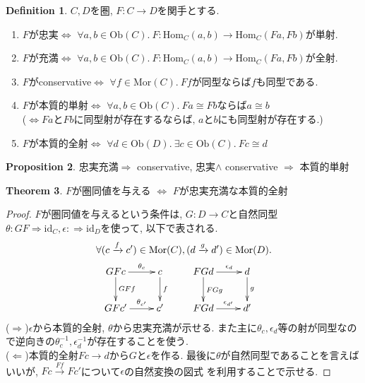 \documentclass[a4paper,10pt]{article}
\theoremstyle{definition}
\newtheorem{thm}{\bfseries Theorem}[section]
\newtheorem{definition}[thm]{\bfseries Definition}
\newtheorem{prop}[thm]{\bfseries Proposition} %
\begin{document}
\begin{definition}
    $C, D$を圏, $F:C \rightarrow D$を関手とする. 
    \begin{enumerate}[(1)]
        \item $F$が忠実$\Longleftrightarrow$ 
        $\forall a,b \in \mathrm{Ob}(C).\  
        F: \mathrm{Hom}_C(a,b) \rightarrow \mathrm{Hom}_C(Fa,Fb)$が単射.
        \item $F$が充満$\Longleftrightarrow$ 
        $\forall a,b \in \mathrm{Ob}(C).\  
        F: \mathrm{Hom}_C(a,b) \rightarrow \mathrm{Hom}_C(Fa,Fb)$が全射.
        \item $F$がconservative$\Longleftrightarrow$ 
        $\forall f \in \mathrm{Mor}(C).\  
        Ff \text{が同型ならば} f \text{も同型である}$.
        \item $F$が本質的単射$\Longleftrightarrow$ 
        $\forall a, b \in \mathrm{Ob}(C).\  
        Fa \cong Fb \text{ならば} a \cong b$ \\
        ($\Longleftrightarrow Fa\text{と}Fb\text{に同型射が存在するならば, }
        a\text{と}b\text{にも同型射が存在する.}$)
        \item $F$が本質的全射$\Longleftrightarrow$ 
        $\forall d \in \mathrm{Ob}(D).\  
        \exists c \in \mathrm{Ob}(C).\ Fc \cong d$
    \end{enumerate}
\end{definition}
\begin{prop}
        忠実充満$\Longrightarrow$ conservative, 
        忠実$\land$ conservative $\Longrightarrow$ 本質的単射
\end{prop}
\begin{thm}
    \label{faithful}
    $F$が圏同値を与える $\Longleftrightarrow$
    $F$が忠実充満な本質的全射
\end{thm}
\begin{proof}
    $F$が圏同値を与えるという条件は, 
    $G: D \rightarrow C$と自然同型$\theta: GF \Rightarrow \mathrm{id}_C, \epsilon:
    \Rightarrow \mathrm{id}_D$を使って, 以下で表される. 
\begin{align*}
    \forall& (c \xrightarrow{f} c') \in \mathrm{Mor}(C), 
    (d \xrightarrow{g} d') \in \mathrm{Mor}(D).\\
&\xymatrix{
GFc \ar[r]^-{\theta_c} \ar[d]^-{GFf} & c \ar[d]^-{f}& 
FGd\ar[r]^-{\epsilon_d} \ar[d]^{FGg} & d \ar[d]^-{g} \\
GFc' \ar[r]^-{\theta_{c'}}& c' 
& FGd\ar[r]^-{\epsilon_{d'}}& d'
}
    \end{align*}
($\Longrightarrow$)$\epsilon$から本質的全射, $\theta$から忠実充満が示せる.
また主に$\theta_c, \epsilon_d$等の射が同型なので逆向きの$\theta_c^{-1}, \epsilon_d^{-1}$が存在することを使う.\\
($\Longleftarrow$)本質的全射$Fc \rightarrow d$から$G$と$\epsilon$を作る. 
最後に$\theta$が自然同型であることを言えばいいが, $Fc \xrightarrow{Ff} Fc'$について$\epsilon$の自然変換の図式
を利用することで示せる. 

\end{proof}
\end{document}
